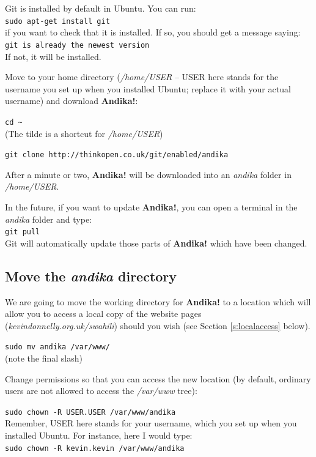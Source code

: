 \documentclass[a4paper,10pt, oneside]{book}
\begin{document}
Git is installed by default in Ubuntu.  You can run:\\
\verb|sudo apt-get install git|\\
if you want to check that it is installed.  If so, you should get a message saying:\\
\verb|git is already the newest version|\\
If not, it will be installed.

Move to your home directory (\textit{/home/USER} -- USER here stands for the username you set up when you installed Ubuntu; replace it with your actual username) and download \textbf{Andika!}:

\verb|cd ~|\\
(The tilde is a shortcut for \textit{/home/USER})

\verb|git clone http://thinkopen.co.uk/git/enabled/andika|

After a minute or two, \textbf{Andika!} will be downloaded into an \textit{andika} folder in \textit{/home/USER}.

In the future, if you want to update \textbf{Andika!}, you can open a terminal in the \textit{andika} folder and type:\\
\verb|git pull|\\
Git will automatically update those parts of \textbf{Andika!} which have been changed.

\subsection{Move the \textit{andika} directory}

We are going to move the working directory for \textbf{Andika!} to a location which will allow you to access a local copy of the website pages (\textit{kevindonnelly.org.uk/swahili}) should you wish (see Section \ref{s:localaccess} below).

\verb|sudo mv andika /var/www/|\\
(note the final slash)

Change permissions so that you can access the new location (by default, ordinary users are not allowed to access the \textit{/var/www} tree):

\verb|sudo chown -R USER.USER /var/www/andika|\\
Remember, USER here stands for your username, which you set up when you installed Ubuntu.  For instance, here I would type:\\
\verb|sudo chown -R kevin.kevin /var/www/andika|
\end{document}
